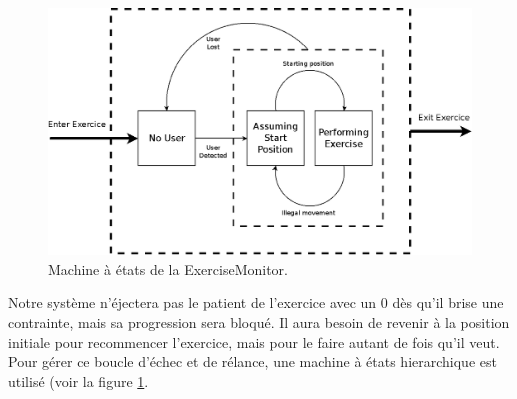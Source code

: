 \begin{figure}[h!]
\centering
\includegraphics[width=0.9\linewidth]{images/exercise_monitor}
\caption{Machine à états de la ExerciseMonitor.}
\label{fig:exercise_monitor}
\end{figure}

Notre système n'éjectera pas le patient de l'exercice avec un 0 dès qu'il brise 
une contrainte, mais sa progression sera bloqué. Il aura besoin de revenir à la
position initiale pour recommencer l'exercice, mais pour le faire autant de fois
qu'il veut. Pour gérer ce boucle d'échec et de rélance, une machine à états
hierarchique est utilisé (voir la figure \ref{fig:exercise_monitor}.
    